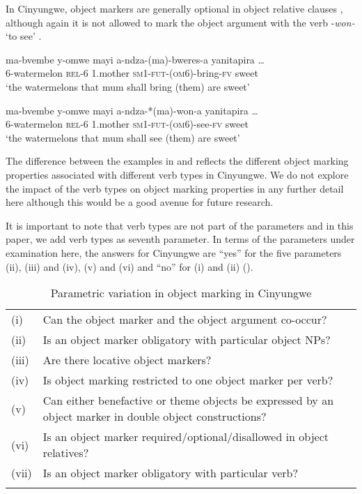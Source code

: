 \documentclass[output=paper]{langscibook}
\begin{document}
In Cinyungwe, object markers are generally optional in object relative clauses , although again it is not allowed to mark the object argument with the verb -\textit{won-} ‘to see’ .  

\ea\label{ex:ngunga:29} \gll ma-bvembe  y-omwe   mayi    a-ndza-(ma)-bweres-a  yanitapira \ldots\\
      6-watermelon  {\textsc{rel}-6}   1.mother  {\textsc{sm1}-\textsc{fut}}{}-({\textsc{om}6}){}-bring-{\textsc{fv}}    sweet\\
\glt      ‘the watermelons that mum shall bring (them) are sweet’
\z

\ea\label{ex:ngunga:30} \gll ma-bvembe  y-omwe  mayi              a-ndza-*(ma)-won-a yanitapira \ldots\\
      6-watermelon  {\textsc{rel}-6}   1.mother  {\textsc{sm1}-\textsc{fut}}{}-({\textsc{om}6}){}-see-{\textsc{fv}}  sweet\\
\glt      ‘the watermelons that mum shall see (them) are sweet’
\z

The difference between the examples in  and  reflects the different object marking properties associated with different verb types in Cinyungwe. We do not explore the impact of the verb types on object marking properties in any further detail here although this would be a good avenue for future research. 

It is important to note that verb types are not part of the \citet{MartenKula2012} parameters and in this paper, we add verb types as seventh parameter. In terms of the parameters under examination here, the answers for Cinyungwe are “yes” for the five parameters (ii), (iii) and (iv), (v) and (vi) and “no” for (i) and (ii) ().

\begin{table}
\caption{\label{tab:ngunga:2} Parametric variation in object marking in Cinyungwe}
\begin{tabularx}{\textwidth}{l@{~}Ql}
\lsptoprule
(i) & Can the object marker and the object argument co-occur? & \\
(ii) & Is an object marker obligatory with particular object NPs? & \\
(iii) & Are there locative object markers? & \\
(iv) & Is object marking restricted to one object marker per verb? & \\
(v) & Can either benefactive or theme objects be expressed by an object marker in double object constructions? & \\
(vi) & Is an object marker required\slash optional\slash disallowed in object relatives? & \\
(vii) & Is an object marker obligatory with particular verb? & \\
\lspbottomrule
\end{tabularx}
\end{table}
\end{document}
